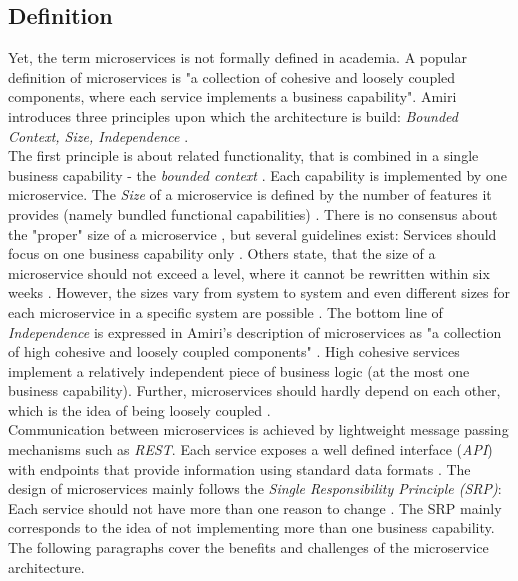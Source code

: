 \subsection{Definition}
Yet, the term microservices is not formally defined in academia. A popular definition of microservices is  "a collection of cohesive and loosely coupled components, where each service implements a business capability"\cite{ObjectAwareAmiri}.
Amiri introduces three principles upon which the architecture is build: \textit{Bounded Context, Size, Independence} \cite{ObjectAwareAmiri}. \\
The first principle is about related functionality, that is combined in a single business capability - the  \textit{bounded context} \cite{FunctionalDecompositionHeinrich}. Each capability is implemented by one microservice. 
The \textit{Size} of a microservice is defined by the number of features it provides (namely bundled functional capabilities)  \cite{WorkloadbasedClustering}. There is no consensus about the "proper" size of a microservice \cite{DomainEngineeringMunezero}, but several guidelines exist: Services should focus on one business capability only \cite{ObjectAwareAmiri}. Others state, that the size of a microservice should not exceed a level, where it cannot be rewritten within six weeks \cite{WorkloadbasedClustering}. However, the sizes vary from system to system \cite{FunctionalDecompositionHeinrich} and even different sizes for each microservice in a specific system are possible \cite{DomainEngineeringMunezero}. The bottom line of \textit{Independence} is expressed in Amiri's description of microservices as "a collection of high cohesive and loosely coupled components" \cite{ObjectAwareAmiri}. High cohesive services implement a relatively independent piece of business logic (at the most one business capability). Further, microservices should hardly depend on each other, which is the idea of being loosely coupled \cite{DataflowDrivenChen}.\\
Communication between microservices is achieved by lightweight message passing mechanisms such as \textit{REST}. Each service exposes a well defined interface (\textit{API}) with endpoints that provide information using standard data formats \cite{FunctionalDecompositionHeinrich}. 
The design of microservices mainly follows the \textit{Single Responsibility Principle (SRP)}: Each service should not have more than one reason to change \cite{TowardsUnderstandingEvolution}. The SRP mainly corresponds to the idea of not implementing more than one business capability.
The following paragraphs cover the benefits and challenges of the microservice architecture.





